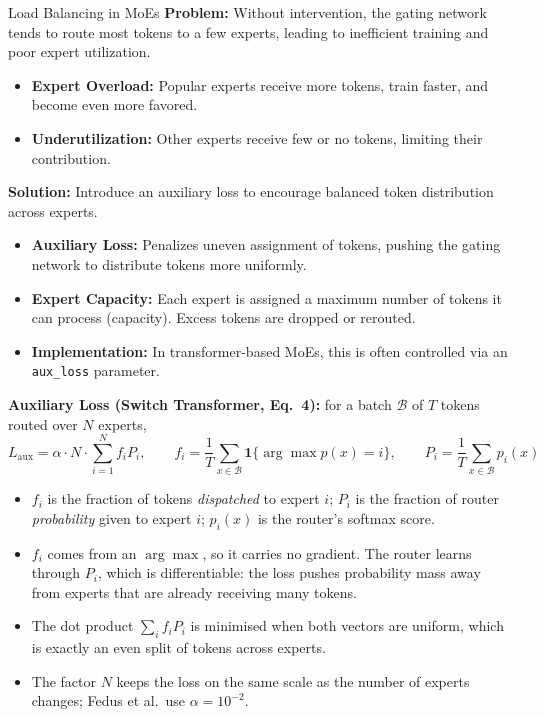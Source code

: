 \begin{frame}[allowframebreaks]{Load Balancing in MoEs}
    \textbf{Problem:} Without intervention, the gating network tends to route most tokens to a few experts, leading to inefficient training and poor expert utilization.

    \begin{itemize}
        \item \textbf{Expert Overload:} Popular experts receive more tokens, train faster, and become even more favored.
        \item \textbf{Underutilization:} Other experts receive few or no tokens, limiting their contribution.
    \end{itemize}

    \textbf{Solution:} Introduce an auxiliary loss to encourage balanced token distribution across experts.

    \begin{itemize}
        \item \textbf{Auxiliary Loss:} Penalizes uneven assignment of tokens, pushing the gating network to distribute tokens more uniformly.
        \item \textbf{Expert Capacity:} Each expert is assigned a maximum number of tokens it can process (capacity). Excess tokens are dropped or rerouted.
        \item \textbf{Implementation:} In transformer-based MoEs, this is often controlled via an \texttt{aux\_loss} parameter.
    \end{itemize}

    \framebreak

    \textbf{Auxiliary Loss (Switch Transformer, Eq.~4):} for a batch $\mathcal{B}$ of $T$ tokens routed over $N$ experts,
    \[
        L_{\text{aux}} = \alpha \cdot N \cdot \sum_{i=1}^{N} f_i P_i,
        \qquad
        f_i = \frac{1}{T}\sum_{x \in \mathcal{B}} \mathbf{1}\{\arg\max p(x) = i\},
        \qquad
        P_i = \frac{1}{T}\sum_{x \in \mathcal{B}} p_i(x)
    \]

    \begin{itemize}
        \item $f_i$ is the fraction of tokens \emph{dispatched} to expert $i$; $P_i$ is the fraction of router \emph{probability} given to expert $i$; $p_i(x)$ is the router's softmax score.
        \item $f_i$ comes from an $\arg\max$, so it carries no gradient. The router learns through $P_i$, which is differentiable: the loss pushes probability mass away from experts that are already receiving many tokens.
        \item The dot product $\sum_i f_i P_i$ is minimised when both vectors are uniform, which is exactly an even split of tokens across experts.
        \item The factor $N$ keeps the loss on the same scale as the number of experts changes; Fedus et al.\ use $\alpha = 10^{-2}$.
    \end{itemize}


\end{frame}
